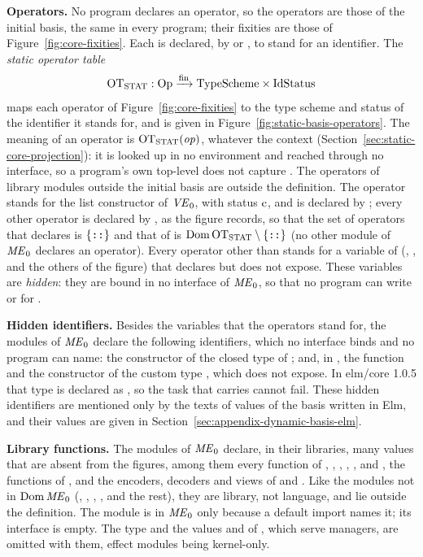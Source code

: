 \textbf{Operators.} No program declares an operator, so the operators are
those of the initial basis, the same in every program; their fixities are
those of Figure~\ref{fig:core-fixities}. Each is declared, by  or
, to stand for an identifier. The \emph{static operator table}
\[
  \mathrm{OT}_{\mathrm{STAT}} : \mathrm{Op} \xrightarrow{\mathrm{fin}} \mathrm{TypeScheme} \times \mathrm{IdStatus}
\]
maps each operator of Figure~\ref{fig:core-fixities} to the type scheme and
status of the identifier it stands for, and is given in
Figure~\ref{fig:static-basis-operators}. The meaning of an operator is
$\mathrm{OT}_{\mathrm{STAT}}(\mathit{op})$, whatever the context (Section~\ref{sec:static-core-projection}):
it is looked up in no environment and reached through no interface, so a
program's own top-level  does not capture \kw{+}. The operators of
library modules outside the initial basis are outside the definition.
The operator \kw{::} stands for the list constructor \kw{::} of $\mathit{VE}_0$, with
status $\mathrm{c}$, and is declared by ; every other operator is declared
by , as the figure records, so that the set of operators that
 declares is $\{\textnormal{\texttt{::}}\}$ and that of  is
$\mathrm{Dom}\,\mathrm{OT}_{\mathrm{STAT}}\setminus\{\textnormal{\texttt{::}}\}$ (no other module of $\mathit{ME}_0$ declares an
operator). Every operator other than \kw{::} stands for a variable of 
(, ,  and the others of the figure) that 
declares but does not expose. These variables are \emph{hidden}: they are
bound in no interface of $\mathit{ME}_0$, so that no program can write
 or  for \kw{(+)}.

\textbf{Hidden identifiers.} Besides the variables that the operators stand
for, the modules of $\mathit{ME}_0$ declare the following identifiers, which no
interface binds and no program can name: the constructor  of
the closed type  of ; and, in , the function
 and the constructor  of the custom type ,
which  does not expose. In elm/core 1.0.5 that type is declared as
, so the task that 
carries cannot fail. These hidden identifiers are mentioned only by the texts of
values of the basis written in Elm, and their values are given in
Section~\ref{sec:appendix-dynamic-basis-elm}. %

\textbf{Library functions.} The modules of $\mathit{ME}_0$ declare, in their
libraries, many values that are absent from the figures, among them every
function of , , , , ,
 and , the functions of , and the encoders,
decoders and views of  and . Like the modules not in
$\mathrm{Dom}\,\mathit{ME}_0$ (, , , ,
 and the rest), they are library, not language, and lie outside
the definition. The module  is in $\mathit{ME}_0$ only because a default
import names it; its interface is empty. The type  and the values
 and  of , which serve managers,
are omitted with them, effect modules being kernel-only. %

